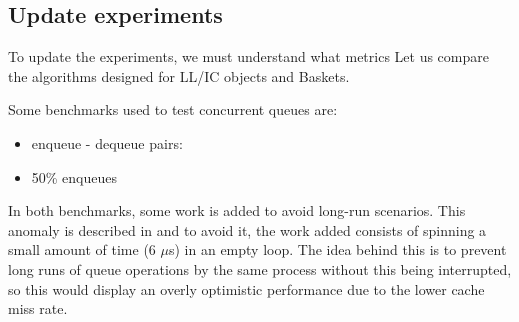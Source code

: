 \subsection{Update experiments}
\label{sec:org5027fac}

To update the experiments, we must understand what metrics
Let us compare the algorithms designed for LL/IC objects and Baskets.

Some benchmarks used to test concurrent queues are:

\begin{itemize}
\item enqueue - dequeue pairs:
\item 50\% enqueues
\end{itemize}

In both benchmarks, some work is added to avoid long-run scenarios. This
anomaly is described in \cite{DBLP_conf_podc_MichaelS96} and to avoid it, the
work added consists of spinning a small amount of time (6 \(\mu\)s) in an
empty loop. The idea behind this is to prevent long runs of queue operations
by the same process without this being interrupted, so this would display
an overly optimistic performance due to the lower cache miss rate.